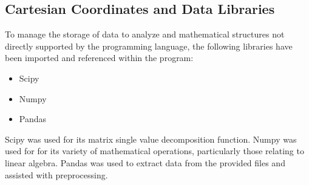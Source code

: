 \documentclass[12pt,letterpaper]{scrartcl}
\begin{document}
    \subsection{Cartesian Coordinates and Data Libraries}
    To manage the storage of data to analyze and mathematical structures not directly supported by the programming language, the following libraries have been imported and referenced within the program:
    \begin{itemize}
        \item Scipy \cite{mckinney-proc-scipy-2010}
        \item Numpy \cite{2020SciPy-NMeth}
        \item Pandas \cite{harris2020array}
    \end{itemize}
    
    Scipy was used for its matrix single value decomposition function.
    Numpy was used for for its variety of mathematical operations, particularly those relating to linear algebra.
    Pandas was used to extract data from the provided files and assisted with preprocessing.
\end{document}
